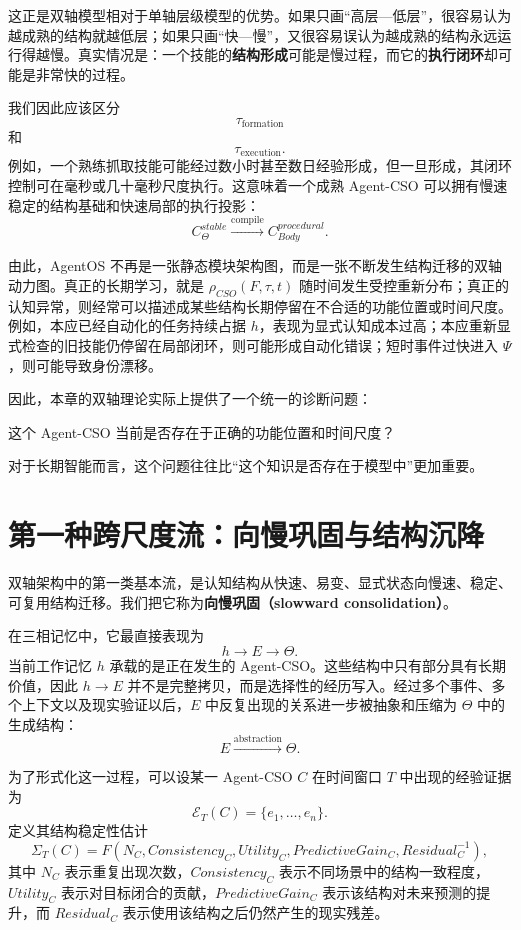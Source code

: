 这正是双轴模型相对于单轴层级模型的优势。如果只画“高层—低层”，很容易认为越成熟的结构就越低层；如果只画“快—慢”，又很容易误认为越成熟的结构永远运行得越慢。真实情况是：一个技能的\textbf{结构形成}可能是慢过程，而它的\textbf{执行闭环}却可能是非常快的过程。

我们因此应该区分
\[
\tau_{\mathrm{formation}}
\]
和
\[
\tau_{\mathrm{execution}}.
\]
例如，一个熟练抓取技能可能经过数小时甚至数日经验形成，但一旦形成，其闭环控制可在毫秒或几十毫秒尺度执行。这意味着一个成熟 Agent-CSO 可以拥有慢速稳定的结构基础和快速局部的执行投影：
\[
C^{stable}_{\Theta}
\xrightarrow{\mathrm{compile}}
C^{procedural}_{Body}.
\]

由此，AgentOS 不再是一张静态模块架构图，而是一张不断发生结构迁移的双轴动力图。真正的长期学习，就是 $\rho_{CSO}(F,\tau,t)$ 随时间发生受控重新分布；真正的认知异常，则经常可以描述成某些结构长期停留在不合适的功能位置或时间尺度。例如，本应已经自动化的任务持续占据 $h$，表现为显式认知成本过高；本应重新显式检查的旧技能仍停留在局部闭环，则可能形成自动化错误；短时事件过快进入 $\Psi$，则可能导致身份漂移。

因此，本章的双轴理论实际上提供了一个统一的诊断问题：
\begin{statementbox}
这个 Agent-CSO 当前是否存在于正确的功能位置和时间尺度？
\end{statementbox}
对于长期智能而言，这个问题往往比“这个知识是否存在于模型中”更加重要。


\section{第一种跨尺度流：向慢巩固与结构沉降}

双轴架构中的第一类基本流，是认知结构从快速、易变、显式状态向慢速、稳定、可复用结构迁移。我们把它称为\textbf{向慢巩固（slowward consolidation）}。

在三相记忆中，它最直接表现为
\[
h\rightarrow E\rightarrow\Theta.
\]
当前工作记忆 $h$ 承载的是正在发生的 Agent-CSO。这些结构中只有部分具有长期价值，因此 $h\rightarrow E$ 并不是完整拷贝，而是选择性的经历写入。经过多个事件、多个上下文以及现实验证以后，$E$ 中反复出现的关系进一步被抽象和压缩为 $\Theta$ 中的生成结构：
\[
E
\xrightarrow{\mathrm{abstraction}}
\Theta.
\]

为了形式化这一过程，可以设某一 Agent-CSO $C$ 在时间窗口 $T$ 中出现的经验证据为
\[
\mathcal E_T(C)
=
\{e_1,\ldots,e_n\}.
\]
定义其结构稳定性估计
\[
\Sigma_T(C)
=
F
\left(
N_C,
Consistency_C,
Utility_C,
PredictiveGain_C,
Residual_C^{-1}
\right),
\]
其中 $N_C$ 表示重复出现次数，$Consistency_C$ 表示不同场景中的结构一致程度，$Utility_C$ 表示对目标闭合的贡献，$PredictiveGain_C$ 表示该结构对未来预测的提升，而 $Residual_C$ 表示使用该结构之后仍然产生的现实残差。

